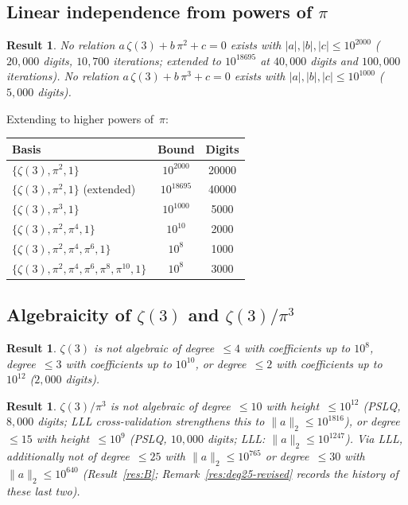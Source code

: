 \documentclass[12pt]{article}
\newtheorem{result}[theorem]{Result}
\theoremstyle{definition}
\theoremstyle{remark}
\begin{document}
\subsection{Linear independence from powers of $\pi$}\label{sec:linear-pi}

\begin{result}\label{res:linear-pi}
No relation $a\,\zeta(3)+b\,\pi^2+c=0$ exists with
$|a|,|b|,|c|\le 10^{2000}$ ($20{,}000$ digits, $10{,}700$ iterations;
extended to $10^{18695}$ at $40{,}000$ digits and $100{,}000$
iterations).  No relation $a\,\zeta(3)+b\,\pi^3+c=0$ exists with
$|a|,|b|,|c|\le 10^{1000}$ ($5{,}000$ digits).
\end{result}

\noindent Extending to higher powers of~$\pi$:
\begin{center}
\begin{tabular}{@{}lcc@{}}
\toprule
Basis & Bound & Digits \\
\midrule
$\{\zeta(3),\pi^2,1\}$ & $10^{2000}$ & 20000 \\
$\{\zeta(3),\pi^2,1\}$ (extended) & $10^{18695}$ & 40000 \\
$\{\zeta(3),\pi^3,1\}$ & $10^{1000}$ & 5000 \\
$\{\zeta(3),\pi^2,\pi^4,1\}$ & $10^{10}$ & 2000 \\
$\{\zeta(3),\pi^2,\pi^4,\pi^6,1\}$ & $10^{8}$ & 1000 \\
$\{\zeta(3),\pi^2,\pi^4,\pi^6,\pi^8,\pi^{10},1\}$ & $10^{8}$ & 3000 \\
\bottomrule
\end{tabular}
\end{center}

\subsection{Algebraicity of $\zeta(3)$ and $\zeta(3)/\pi^3$}\label{sec:algebraicity}

\begin{result}\label{res:alg-z3}
$\zeta(3)$ is not algebraic of degree~$\le 4$ with
coefficients up to $10^8$, degree~$\le 3$ with coefficients up to
$10^{10}$, or degree~$\le 2$ with coefficients up to~$10^{12}$
($2{,}000$ digits).
\end{result}

\begin{result}\label{res:alg-ratio}
$\zeta(3)/\pi^3$ is not algebraic of degree~$\le 10$ with
height~$\le 10^{12}$ (PSLQ, $8{,}000$ digits; LLL cross-validation
strengthens this to $\|a\|_2 \le 10^{1816}$), or degree~$\le 15$ with
height~$\le 10^9$ (PSLQ, $10{,}000$ digits; LLL:
$\|a\|_2 \le 10^{1247}$).  Via LLL, additionally not of
degree~$\le 25$ with $\|a\|_2 \le 10^{765}$ or degree~$\le 30$ with
$\|a\|_2 \le 10^{640}$ (Result~\ref{res:B};
Remark~\ref{res:deg25-revised} records the history of these last
two).
\end{result}
\end{document}
